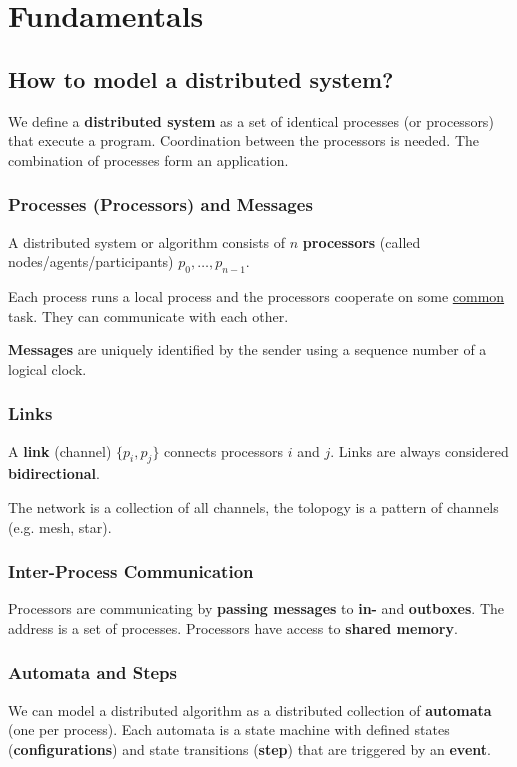 \documentclass[12pt,A4]{extarticle}
\newcommand{\highlight}[1]{\textcolor{highlightColor}{\textbf{#1}}}
\begin{document}
\section{Fundamentals}
\subsection{How to model a distributed system?}
We define a \textbf{distributed system} as a set of identical processes (or processors) that execute a program. Coordination between the processors is needed. The combination of processes form an application.

\subsubsection{Processes (Processors) and Messages}
A distributed system or algorithm consists of $n$ \highlight{processors} (called nodes/agents/participants) $p_0, \dots, p_{n-1}$.\par
Each process runs a local process and the processors cooperate on some \underline{common} task. They can communicate with each other.\par
\highlight{Messages} are uniquely identified by the sender using a sequence number of a logical clock.

\subsubsection{Links}
A \highlight{link} (channel) $\{p_i, p_j\}$ connects processors $i$ and $j$. Links are always considered \textbf{bidirectional}.\par
The network is a collection of all channels, the tolopogy is a pattern of channels (e.g. mesh, star).

\subsubsection{Inter-Process Communication}
Processors are communicating by \textbf{passing messages} to \textbf{in-} and \textbf{outboxes}. The address is a set of processes. Processors have access to \highlight{shared memory}.

\subsubsection{Automata and Steps}
We can model a distributed algorithm as a distributed collection of \highlight{automata} (one per process). Each automata is a state machine with defined states (\textbf{configurations}) and state transitions (\textbf{step}) that are triggered by an \textbf{event}.
\end{document}
